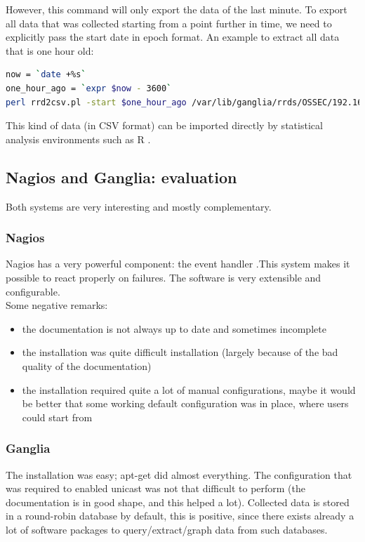 \documentclass[12pt]{report}
\begin{document}
However, this command will only export the data of the last minute. To
export all data that was collected starting from a point further in time, we need to
explicitly pass the start date in epoch format.
An example to extract all data that is one hour old:
\begin{lstlisting}[language=bash]
now = `date +%s`
one_hour_ago = `expr $now - 3600` 
perl rrd2csv.pl -start $one_hour_ago /var/lib/ganglia/rrds/OSSEC/192.168.15.4/cpu\_user.rrd > node1_cpu_user.csv
\end{lstlisting} 

This kind of data (in CSV format) can be imported directly by statistical analysis
environments such as R \cite{r_software}.

\subsection{Nagios and Ganglia: evaluation}
Both systems are very interesting and mostly complementary.
\subsubsection{Nagios}
Nagios has a very powerful component: the event handler .This system makes it
possible to react properly on failures. The software is very
extensible and configurable.\\
Some negative remarks: 
\begin{itemize}
\item the documentation is not always up to date and sometimes incomplete
\item the installation was quite difficult installation (largely
  because of the bad quality of the documentation)
\item the installation required quite a lot of manual configurations,
  maybe it would be better that some working default configuration was
  in place, where users could start from
\end{itemize}
\subsubsection{Ganglia}
The installation was easy; apt-get did almost everything. The
configuration that was required to enabled unicast was not that
difficult to perform (the documentation is in good shape, and this helped a lot).
Collected data is stored in a round-robin database by default, this is
positive, since there exists already a lot of software packages
to query/extract/graph data from such databases.
\end{document}
